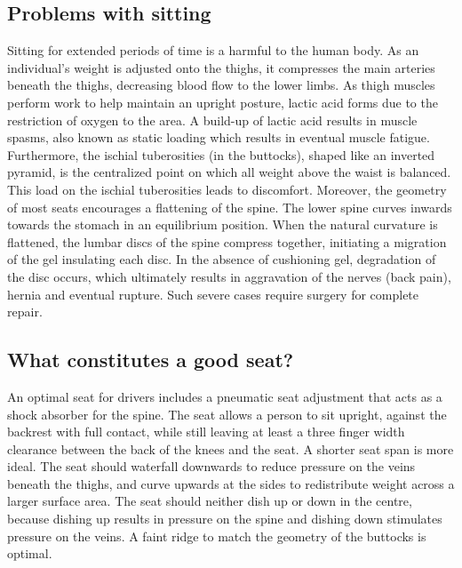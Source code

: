 \documentclass[11pt]{article}
\begin{document}
\subsection{Problems with sitting}
\label{sec:sittingproblems}

Sitting for extended periods of time is a harmful to the human body. As an individual's weight is adjusted
onto the thighs, it compresses the main arteries beneath the thighs, decreasing 
blood flow to the lower limbs. As thigh muscles perform work to help maintain an upright posture, 
lactic acid forms due to the restriction of oxygen to the area. A build-up of lactic acid results in muscle spasms, also known as static
loading which results in eventual muscle fatigue. Furthermore, the ischial 
tuberosities (in the buttocks), shaped like an inverted pyramid, is the centralized point on which all weight above the waist  
is balanced. This load on the ischial tuberosities leads to discomfort. Moreover, the geometry of most seats encourages a flattening of the 
spine. The lower spine curves inwards towards the stomach in an equilibrium position. When the natural curvature 
is flattened, the lumbar discs of the spine compress together, initiating a migration of 
the gel insulating each disc. In the absence of cushioning gel, degradation of the disc occurs, which 
ultimately results in aggravation of the nerves (back pain), hernia and eventual rupture. Such severe cases
require surgery for complete repair\cite{ergoCentricAnatomy2011}.

\subsection{What constitutes a good seat?}
An optimal seat for drivers includes a pneumatic seat adjustment that acts as a shock absorber for the spine. The seat 
allows a person to sit upright, against the backrest with full contact, while still leaving at least a 
three finger width clearance between the back of the knees and the seat. A shorter seat span is more ideal. 
The seat should waterfall downwards to reduce pressure on the veins beneath the thighs, and curve 
upwards at the sides to redistribute weight across a larger surface area. 
The seat should neither dish 
up or down in the centre, because dishing up results in pressure on the spine and dishing down stimulates pressure on the veins. 
A faint ridge to match the geometry of the buttocks is optimal\cite{ergoCentricchair2011, Natpost2005}.
\end{document}
